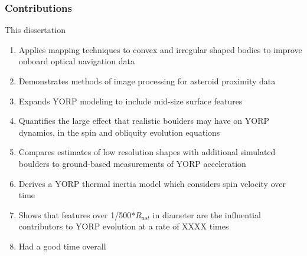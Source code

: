 \subsubsection{Contributions}
This dissertation
\begin{enumerate}
    \item Applies mapping techniques to convex and irregular shaped bodies to improve onboard optical navigation data
    \item Demonstrates methods of image processing for asteroid proximity data
    \item Expands YORP modeling to include mid-size surface features
    \item Quantifies the large effect that realistic boulders may have on YORP dynamics, in the spin and obliquity evolution equations
    \item Compares estimates of low resolution shapes with additional simulated boulders to ground-based measurements of YORP acceleration
    \item Derives a YORP thermal inertia model which considers spin velocity over time
    \item Shows that features over 1/500*$R_{ast}$ in diameter are the influential contributors to YORP evolution at a rate of XXXX times 
    \item Had a good time overall
\end{enumerate}




























